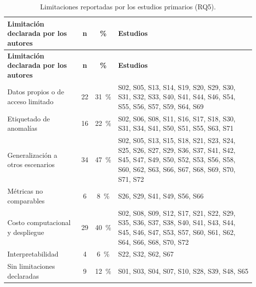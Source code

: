 \begingroup
\small
\begin{xltabular}{\linewidth}{lccX}
\caption{Limitaciones reportadas por los estudios primarios (RQ5).}\label{tab:limitaciones}\\
\toprule
\textbf{Limitaci\'{o}n declarada por los autores} & \textbf{n} & \textbf{\%} & \textbf{Estudios} \\
\midrule\endfirsthead
\toprule
\textbf{Limitaci\'{o}n declarada por los autores} & \textbf{n} & \textbf{\%} & \textbf{Estudios} \\
\midrule\endhead
\bottomrule\endfoot
Datos propios o de acceso limitado & 22 & 31~\% & S02, S05, S13, S14, S19, S20, S29, S30, S31, S32, S33, S40, S41, S44, S46, S54, S55, S56, S57, S59, S64, S69 \\
Etiquetado de anomal\'{i}as & 16 & 22~\% & S02, S06, S08, S11, S16, S17, S18, S30, S31, S34, S41, S50, S51, S55, S63, S71 \\
Generalizaci\'{o}n a otros escenarios & 34 & 47~\% & S02, S05, S13, S15, S18, S21, S23, S24, S25, S26, S27, S29, S36, S37, S41, S42, S45, S47, S49, S50, S52, S53, S56, S58, S60, S62, S63, S66, S67, S68, S69, S70, S71, S72 \\
M\'{e}tricas no comparables & 6 & 8~\% & S26, S29, S41, S49, S56, S66 \\
Costo computacional y despliegue & 29 & 40~\% & S02, S08, S09, S12, S17, S21, S22, S29, S35, S36, S37, S38, S40, S41, S43, S44, S45, S46, S47, S53, S57, S60, S61, S62, S64, S66, S68, S70, S72 \\
Interpretabilidad & 4 & 6~\% & S22, S32, S62, S67 \\
Sin limitaciones declaradas & 9 & 12~\% & S01, S03, S04, S07, S10, S28, S39, S48, S65 \\
\end{xltabular}
\vspace{-6pt}{\footnotesize\raggedright Un estudio puede declarar varias limitaciones.\par}
\endgroup

